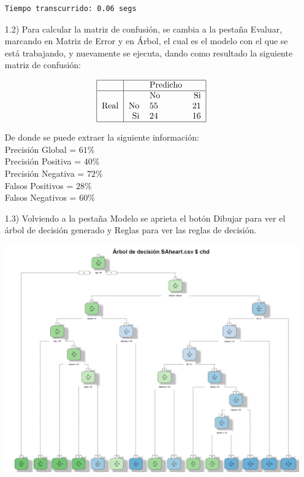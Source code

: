 \documentclass[11pt,a4paper]{report}
\begin{document}
\begin{itemize}
\begin{verbatim}
Tiempo transcurrido: 0.06 segs

\end{verbatim}
\item[1.2)] Para calcular la matriz de confusión, se cambia a la pestaña Evaluar, marcando en Matriz de Error y en Árbol, el cual es el modelo con el que se está trabajando, y nuevamente se ejecuta, dando como resultado la siguiente matriz de confusión:

$$\begin{tabular}{| c |  r l  r |}
\hline
  & & Predicho&  \\
   \hline
     &  & No& Si \\
 Real& No   &55 &21 \\
     & Si   &24 & 16\\
   \hline
 \end{tabular} $$

De donde se puede extraer la siguiente información:\\
Precisión Global = $61\%$\\
Precisión Positiva = $40\%$\\
Precisión Negativa = $72\%$\\
Falsos Positivos = $28\%$\\
Falsos Negativos = $60\%$\\

\item[1.3)] Volviendo a la pestaña Modelo se aprieta el botón Dibujar para ver el árbol de decisión generado y Reglas para ver las reglas de decisión.
\begin{center}
\includegraphics[scale=0.35]{arbol.png}
\end{center}


\end{itemize}
\end{document}
